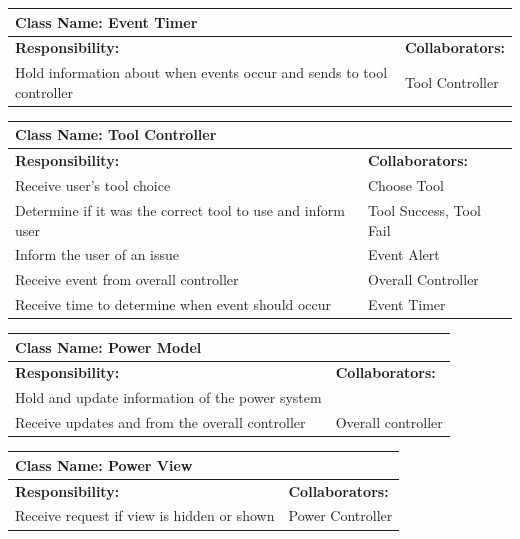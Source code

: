 \documentclass[12pt, titlepage]{article}
\begin{document}
\begin{enumerate}[a)]
	\begin{table}[H]
		\centering
		\begin{tabular}{|p{10cm}|p{5cm}|}
		\hline 
		 \multicolumn{2}{|l|}{\textbf{Class Name: Event Timer}} \\
		\hline
		\textbf{Responsibility:} & \textbf{Collaborators:} \\
		\hline
		 Hold information about when events occur and sends to tool controller & Tool Controller\\
		\hline
		\end{tabular}
	\end{table}

	\begin{table}[H]
		\centering
		\begin{tabular}{|p{10cm}|p{5cm}|}
		\hline 
		 \multicolumn{2}{|l|}{\textbf{Class Name: Tool Controller}} \\
		\hline
		\textbf{Responsibility:} & \textbf{Collaborators:} \\
		\hline
		 Receive user's tool choice & Choose Tool\\
		\hline
		 Determine if it was the correct tool to use and inform user & Tool Success, Tool Fail \\
		\hline
		 Inform the user of an issue & Event Alert \\
		\hline
		 Receive event from overall controller & Overall Controller \\
		\hline
		Receive time to determine when event should occur & Event Timer \\
		\hline
		\end{tabular}
	\end{table}

	\begin{table}[H]
		\centering
		\begin{tabular}{|p{10cm}|p{5cm}|}
		\hline 
		 \multicolumn{2}{|l|}{\textbf{Class Name: Power Model}} \\
		\hline
		\textbf{Responsibility:} & \textbf{Collaborators:} \\
		\hline
		 Hold and update information of the power system & \\
		\hline
		Receive updates and from the overall controller & Overall controller \\
		\hline
		\end{tabular}
	\end{table}

	\begin{table}[H]
		\centering
		\begin{tabular}{|p{10cm}|p{5cm}|}
		\hline 
		 \multicolumn{2}{|l|}{\textbf{Class Name: Power View}} \\
		\hline
		\textbf{Responsibility:} & \textbf{Collaborators:} \\
		\hline 
		 Receive request if view is hidden or shown & Power Controller\\
		\hline
		\end{tabular}
	\end{table}


\end{enumerate}
\end{document}
